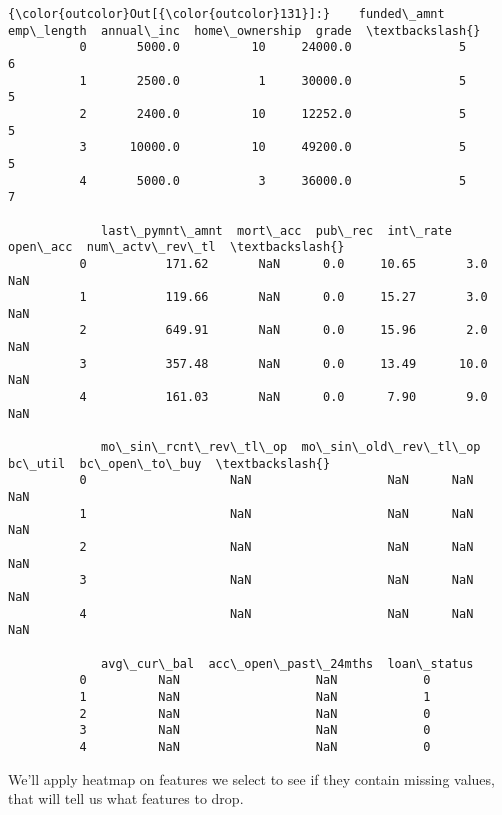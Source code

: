 \documentclass[11pt]{article}
\begin{document}
\begin{Verbatim}[commandchars=\\\{\}]
{\color{outcolor}Out[{\color{outcolor}131}]:}    funded\_amnt  emp\_length  annual\_inc  home\_ownership  grade  \textbackslash{}
          0       5000.0          10     24000.0               5      6   
          1       2500.0           1     30000.0               5      5   
          2       2400.0          10     12252.0               5      5   
          3      10000.0          10     49200.0               5      5   
          4       5000.0           3     36000.0               5      7   
          
             last\_pymnt\_amnt  mort\_acc  pub\_rec  int\_rate  open\_acc  num\_actv\_rev\_tl  \textbackslash{}
          0           171.62       NaN      0.0     10.65       3.0              NaN   
          1           119.66       NaN      0.0     15.27       3.0              NaN   
          2           649.91       NaN      0.0     15.96       2.0              NaN   
          3           357.48       NaN      0.0     13.49      10.0              NaN   
          4           161.03       NaN      0.0      7.90       9.0              NaN   
          
             mo\_sin\_rcnt\_rev\_tl\_op  mo\_sin\_old\_rev\_tl\_op  bc\_util  bc\_open\_to\_buy  \textbackslash{}
          0                    NaN                   NaN      NaN             NaN   
          1                    NaN                   NaN      NaN             NaN   
          2                    NaN                   NaN      NaN             NaN   
          3                    NaN                   NaN      NaN             NaN   
          4                    NaN                   NaN      NaN             NaN   
          
             avg\_cur\_bal  acc\_open\_past\_24mths  loan\_status  
          0          NaN                   NaN            0  
          1          NaN                   NaN            1  
          2          NaN                   NaN            0  
          3          NaN                   NaN            0  
          4          NaN                   NaN            0  
\end{Verbatim}
            
    We'll apply heatmap on features we select to see if they contain missing
values, that will tell us what features to drop.
\end{document}

